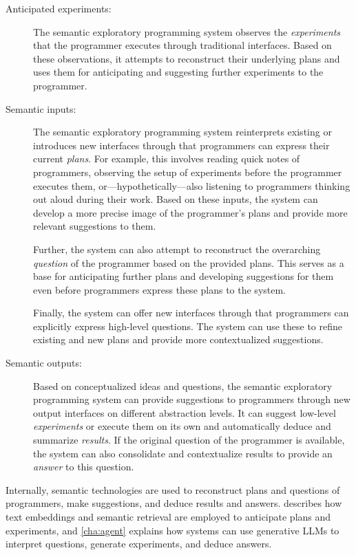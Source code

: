 \begin{description}
	\item[Anticipated experiments:]
	The semantic exploratory programming system observes the \emph{experiments} that the programmer executes through traditional interfaces.
	Based on these observations, it attempts to reconstruct their underlying plans and uses them for anticipating and suggesting further experiments to the programmer.

	\item[Semantic inputs:]
	The semantic exploratory programming system reinterprets existing or introduces new interfaces through that programmers can express their current \emph{plans}.
	For example, this involves reading quick notes of programmers, observing the setup of experiments before the programmer executes them, or---hypothetically---also listening to programmers thinking out aloud during their work.
	Based on these inputs, the system can develop a more precise image of the programmer's plans and provide more relevant suggestions to them.

	Further, the system can also attempt to reconstruct the overarching \emph{question} of the programmer based on the provided plans.
	This serves as a base for anticipating further plans and developing suggestions for them even before programmers express these plans to the system.

	Finally, the system can offer new interfaces through that programmers can explicitly express high-level questions.
	The system can use these to refine existing and new plans and provide more contextualized suggestions.

	\item[Semantic outputs:]
	Based on conceptualized ideas and questions, the semantic exploratory programming system can provide suggestions to programmers through new output interfaces on different abstraction levels.
	It can suggest low-level \emph{experiments} or execute them on its own and automatically deduce and summarize \emph{results}.
	If the original question of the programmer is available, the system can also consolidate and contextualize results to provide an \emph{answer} to this question.
\end{description}

Internally, semantic technologies are used to reconstruct plans and questions of programmers, make suggestions, and deduce results and answers.
 describes how text embeddings and semantic retrieval are employed to anticipate plans and experiments, and \cref{cha:agent} explains how systems can use generative LLMs to interpret questions, generate experiments, and deduce answers.
